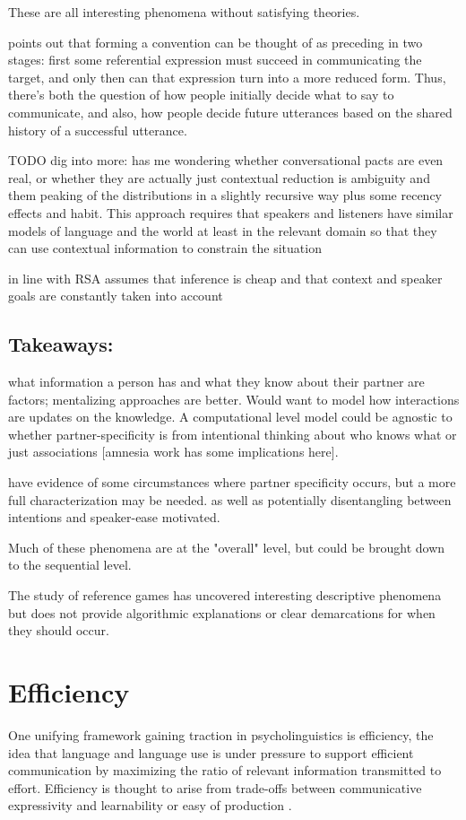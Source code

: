 \documentclass[]{article}
\begin{document}
These are all interesting phenomena without satisfying theories. 

\cite{leung2023} points out that forming a convention can be thought of as preceding in two stages: first some referential expression must succeed in communicating the target, and only then can that expression turn into a more reduced form. Thus, there's both the question of how people initially decide what to say to communicate, and also, how people decide future utterances based on the shared history of a successful utterance. 

TODO dig into more: \cite{piantadosi2012} has me wondering whether conversational pacts are even real, or whether they are actually just contextual reduction is ambiguity and them peaking of the distributions in a slightly recursive way plus some recency effects and habit. This approach requires that speakers and listeners have similar models of language and the world at least in the relevant domain so that they can use contextual information to constrain the situation 

\cite{piantadosi2012} in line with RSA assumes that inference is cheap and that context and speaker goals are constantly taken into account 

\subsection{Takeaways:} what information a person has and what they know about their partner are factors; mentalizing approaches are better. Would want to model how interactions are updates on the knowledge. A computational level model could be agnostic to whether partner-specificity is from intentional thinking about who knows what or just associations [amnesia work has some implications here].  

have evidence of some circumstances where partner specificity occurs, but a more full characterization may be needed. as well as potentially disentangling between intentions and speaker-ease motivated. 

Much of these phenomena are at the "overall" level, but could be brought down to the sequential level. 

The study of reference games has uncovered interesting descriptive phenomena but does not provide algorithmic explanations or clear demarcations for when they should occur. 

\section{Efficiency}
One unifying framework gaining traction in psycholinguistics is efficiency, the idea that language and language use is under pressure to support efficient communication by maximizing the ratio of relevant information transmitted to effort. Efficiency is thought to arise from trade-offs between communicative expressivity and learnability or easy of production \cite{piantadosi2012, kirby2015}. 
\end{document}
